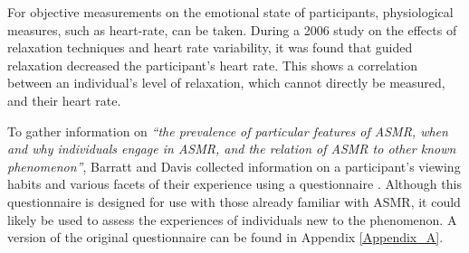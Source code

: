 \documentclass{sigchi}
\newcommand{\inlinequote}[1]{\textit{``#1''}}
\begin{document}
For objective measurements on the emotional state of participants, physiological measures, such as heart-rate, can be taken. During a 2006 study on the effects of relaxation techniques and heart rate variability, it was found that guided relaxation decreased the participant's heart rate\cite{sarang2006effects}. This shows a correlation between an individual's level of relaxation, which cannot directly be measured, and their heart rate.

To gather information on \inlinequote{the prevalence of particular features of ASMR, when and why individuals engage in ASMR, and the relation of ASMR to other known phenomenon}, Barratt and Davis collected information on a participant's viewing habits and various facets of their experience using a questionnaire \cite{barratt2015autonomous}. Although this questionnaire is designed for use with those already familiar with ASMR, it could likely be used to assess the experiences of individuals new to the phenomenon. A version of the original questionnaire can be found in Appendix \ref{Appendix_A}. 



\end{document}

